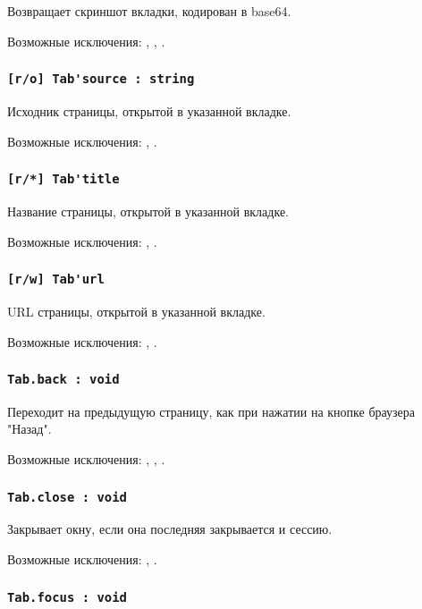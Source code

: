 Возвращает скриншот вкладки, кодирован в base64.

Возможные исключения: , , .

\subsubsection{\lstinline|[r/o] Tab'source : string|}

Исходник страницы, открытой в указанной вкладке.

Возможные исключения: , .

\subsubsection{\lstinline|[r/*] Tab'title|}

Название страницы, открытой в указанной вкладке.

Возможные исключения: , .

\subsubsection{\lstinline|[r/w] Tab'url|}

URL страницы, открытой в указанной вкладке.

Возможные исключения: , .

\subsubsection{\lstinline|Tab.back : void|}

Переходит на предыдущую страницу, как при нажатии на кнопке браузера "Назад".

Возможные исключения: , , .

\subsubsection{\lstinline|Tab.close : void|}

Закрывает окну, если она последняя закрывается и сессию.

Возможные исключения: , .

\subsubsection{\lstinline|Tab.focus : void|}

